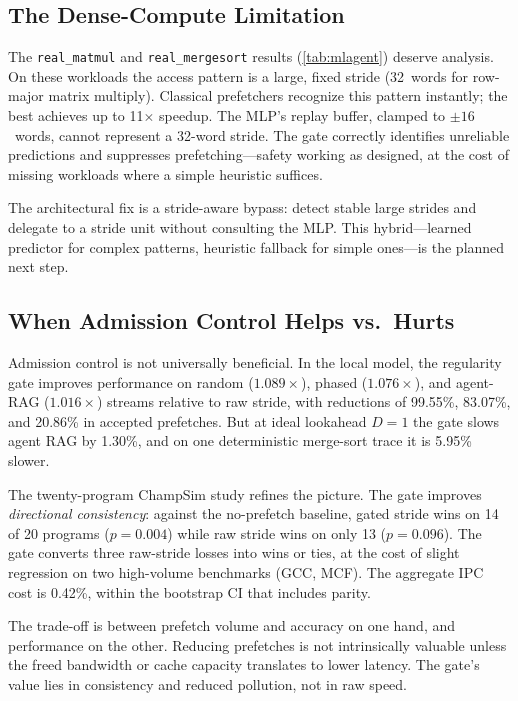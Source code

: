\documentclass[sigplan,anonymous,review,nonacm]{acmart}
\begin{document}
\subsection{The Dense-Compute Limitation}

The \texttt{real\_matmul} and \texttt{real\_mergesort} results
(\cref{tab:mlagent}) deserve analysis. On these workloads the access
pattern is a large, fixed stride (32~words for row-major matrix multiply).
Classical prefetchers recognize this pattern instantly; the best
achieves up to 11$\times$ speedup. The MLP's replay buffer, clamped to ${\pm}16$~words,
cannot represent a 32-word stride. The gate correctly identifies unreliable
predictions and suppresses prefetching---safety working as designed, at the
cost of missing workloads where a simple heuristic suffices.

The architectural fix is a stride-aware bypass: detect stable large strides
and delegate to a stride unit without consulting the MLP. This
hybrid---learned predictor for complex patterns, heuristic fallback for
simple ones---is the planned next step.

\subsection{When Admission Control Helps vs.\ Hurts}

Admission control is not universally beneficial. In the local model, the
regularity gate improves performance on random ($1.089\times$), phased
($1.076\times$), and agent-RAG ($1.016\times$) streams relative to raw
stride, with reductions of 99.55\%, 83.07\%, and 20.86\% in accepted
prefetches. But at ideal lookahead $D = 1$ the gate slows agent RAG by
1.30\%, and on one deterministic merge-sort trace it is 5.95\% slower.

The twenty-program ChampSim study refines the picture. The gate improves
\emph{directional consistency}: against the no-prefetch baseline, gated
stride wins on 14 of 20 programs ($p = 0.004$) while raw stride wins on
only 13 ($p = 0.096$). The gate converts three raw-stride losses into wins
or ties, at the cost of slight regression on two high-volume benchmarks
(GCC, MCF). The aggregate IPC cost is 0.42\%, within the bootstrap CI that
includes parity.

The trade-off is between prefetch volume and accuracy on one hand, and
performance on the other. Reducing prefetches is not intrinsically valuable
unless the freed bandwidth or cache capacity translates to lower latency.
The gate's value lies in consistency and reduced pollution, not in raw speed.
\end{document}
